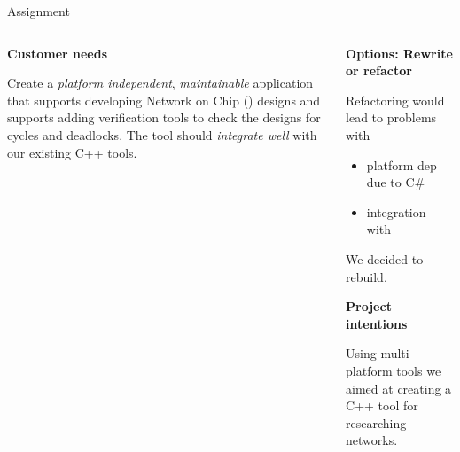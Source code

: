\documentclass[11pt]{beamer}
\begin{document}
\begin{frame}{Assignment}
	\begin{columns}
		\begin{column}[t]{5cm}
		
		\textbf{Customer needs}

		Create a {\it platform independent}, {\it maintainable} application that supports
		developing Network on Chip (\Noc) designs and supports adding verification tools
		to check the \Noc designs for cycles and deadlocks. The tool should {\it integrate well}
		with our existing C++ tools.

		\end{column}
		\begin{column}[t]{5cm}
		\textbf{Options: Rewrite or refactor}		
		
		Refactoring would lead to problems with
		\begin{itemize}
			\item platform dep due to C\#
			\item integration with \cpp
		\end{itemize}
		
		We decided to rebuild.
		
		{\bf Project intentions}		
		
		Using multi-platform tools we aimed at creating a C++ tool for researching \Noc networks.
		
		\end{column}
	\end{columns}
\end{frame}
\end{document}
